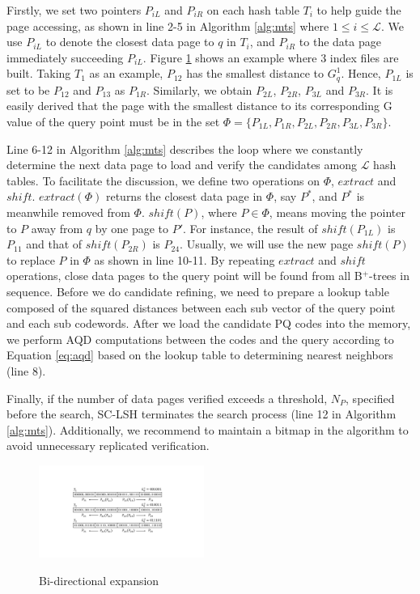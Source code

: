 \documentclass[twocolumn]{svjour3}          %
\begin{document}
Firstly, we set two pointers $P_{iL}$ and $P_{iR}$ on each hash table $T_i$ to help guide the page accessing, as shown in line 2-5 in Algorithm \ref{alg:mts} where $1\leq i \leq \mathcal{L}$. We use $P_{iL}$ to denote the closest data page to $q$ in $T_i$, and $P_{iR}$ to the data page immediately succeeding $P_{iL}$. Figure \ref{fig:search} shows an example where 3 index files are built.
Taking $T_1$ as an example, $P_{12}$ has the smallest distance to $G_{q}^1$. Hence, $P_{1L}$ is set to be $P_{12}$ and $P_{13}$ as $P_{1R}$. Similarly, we obtain $P_{2L}$, $P_{2R}$, $P_{3L}$ and $P_{3R}$. It is easily derived that the page with the smallest distance to its corresponding G value of the query point must be in the set $\Phi=\{P_{1L}, P_{1R}, P_{2L}, P_{2R}, P_{3L}, P_{3R} \}$.

Line 6-12 in Algorithm \ref{alg:mts} describes the loop where we constantly determine the next data page to load and verify the candidates among $\mathcal{L}$ hash tables. To facilitate the discussion, we define two operations on $\Phi$, $extract$ and $shift$. $extract(\Phi)$ returns the closest data page in $\Phi$, say $P^*$, and $P^*$ is meanwhile removed from $\Phi$. $shift(P)$, where $P \in \Phi$, means moving the pointer to $P$ away from $q$ by one page to $P'$. For instance, the result of $shift(P_{1L})$ is $P_{11}$ and that of $shift(P_{2R})$ is $P_{24}$. Usually, we will use the new page $shift(P)$ to replace $P$ in $\Phi$ as shown in line 10-11. By repeating $extract$ and $shift$ operations, close data pages to the query point will be found from all B$^+$-trees in sequence.
Before we do candidate refining, we need to prepare a lookup table composed of the squared distances between each sub vector of the query point and each sub codewords. After we load the candidate PQ codes into the memory, we perform AQD computations between the codes and the query according to Equation \ref{eq:aqd} based on the lookup table to determining nearest neighbors (line 8).

Finally, if the number of data pages verified exceeds a threshold, $N_P$, specified before the search, SC-LSH terminates the search process (line 12 in Algorithm \ref{alg:mts}). Additionally, we recommend to maintain a bitmap in the algorithm to avoid unnecessary replicated verification.
\begin{figure}[t]
	\begin{center}
		{
			\includegraphics[width=0.48\textwidth]{search.pdf}
		}
	\end{center}
	\caption{Bi-directional expansion}
	\label{fig:search}
\end{figure}
\end{document}
